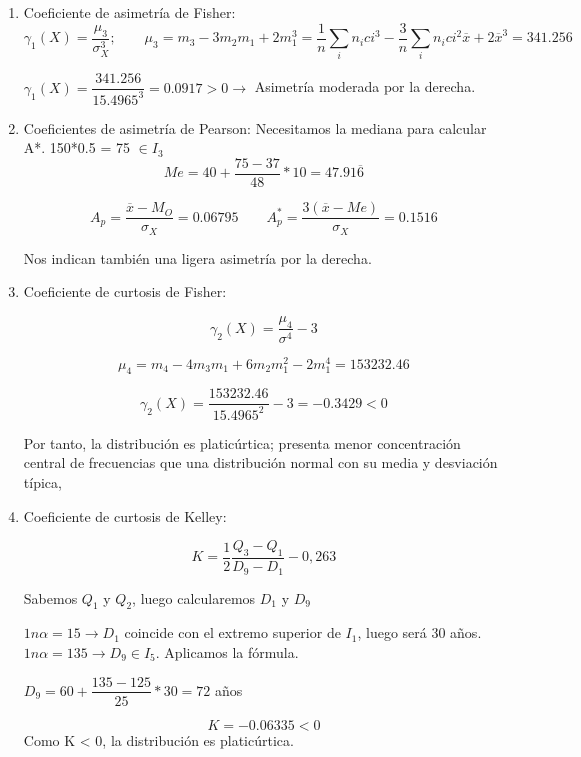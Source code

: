 \begin{enumerate}
	\item Coeficiente de asimetría de Fisher:
	$$\gamma_1(X) = \dfrac{\mu_3}{\sigma_X^3};\qquad
	\mu_3 = m_3 - 3m_2m_1 + 2m_1^3 = \dfrac{1}{n}\sum_{i} n_i ci^3 - \dfrac{3}{n}
	\sum_{i} n_i ci^2\overline{x}  + 2\overline{x}^3 = 341.256$$
    
    $\gamma_1(X) = \dfrac{341.256}{15.4965^3} = 0.0917 > 0 \longrightarrow $ Asimetría moderada por la derecha.

	\item Coeficientes de asimetría de Pearson:
	Necesitamos la mediana para calcular A*. 150*0.5 = 75 $\in I_3$
	$$Me = 40 + \dfrac{75-37}{48}*10 = 47.91\overline{6}$$

	$$A_p = \dfrac{\overline{x}- M_O}{\sigma_X} = 0.06795 \qquad A_p^* = \dfrac{3(\overline{x}- Me)}{\sigma_X} = 0.1516$$
    
    Nos indican también una ligera asimetría por la derecha.

	\item Coeficiente de curtosis de Fisher:

	$$\gamma_2(X) = \dfrac{\mu_4}{\sigma^4} - 3$$
    
    $$\mu_4 = m_4 - 4m_3m_1 + 6m_2m_1^2 - 2m_1^4 = 153232.46$$
    
    $$\gamma_2(X) = \dfrac{153232.46}{15.4965^2} - 3 = -0.3429 < 0$$
	
	Por tanto, la distribución es platicúrtica; presenta menor concentración central de frecuencias que una distribución normal con su media y desviación típica,
	
	\item Coeficiente de curtosis de Kelley:
	
	$$K = \dfrac{1}{2} \dfrac{Q_3 - Q_1}{D_9 - D_1}- 0,263$$
	
	Sabemos $Q_1$ y $Q_2$, luego calcularemos $D_1$ y $D_9$
	
	$1n\alpha = 15 \longrightarrow D_1$ coincide con el extremo superior de $I_1$, luego será 30 años.
	$1n\alpha = 135 \longrightarrow D_9 \in I_5$. Aplicamos la fórmula.
	\begin{center}
	    $ D_9 = 60 + \dfrac{135- 125}{25}*30 = 72 $ años
	\end{center}
	 $$ K = -0.06335 < 0 $$
Como K < 0, la distribución es platicúrtica.
\end{enumerate}

